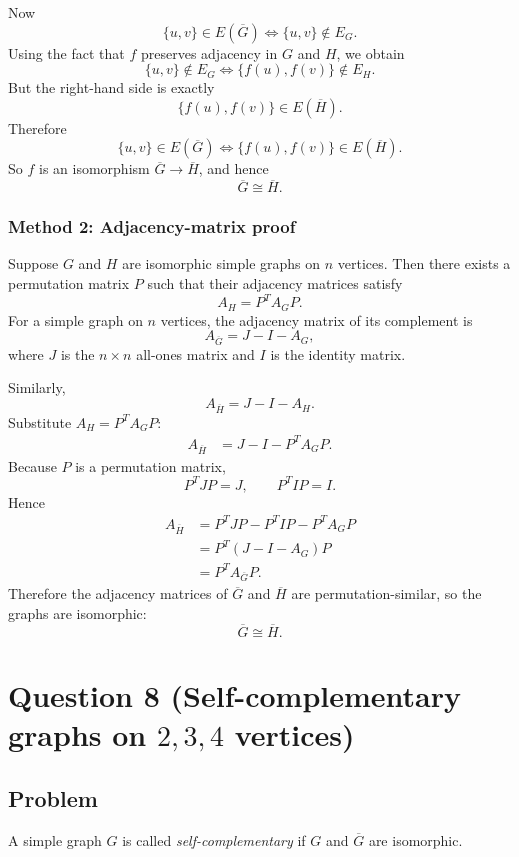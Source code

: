 \documentclass[12pt]{article}
\newcommand{\comp}[1]{\overline{#1}}
\begin{document}
Now
\[
\{u,v\}\in E(\comp{G})
\iff
\{u,v\}\notin E_G.
\]
Using the fact that \(f\) preserves adjacency in \(G\) and \(H\), we obtain
\[
\{u,v\}\notin E_G
\iff
\{f(u),f(v)\}\notin E_H.
\]
But the right-hand side is exactly
\[
\{f(u),f(v)\}\in E(\comp{H}).
\]
Therefore
\[
\{u,v\}\in E(\comp{G})
\iff
\{f(u),f(v)\}\in E(\comp{H}).
\]
So \(f\) is an isomorphism \(\comp{G}\to \comp{H}\), and hence
\[
\boxed{\comp{G}\cong \comp{H}.}
\]

\subsubsection{Method 2: Adjacency-matrix proof}
Suppose \(G\) and \(H\) are isomorphic simple graphs on \(n\) vertices. Then there exists a permutation matrix \(P\) such that their adjacency matrices satisfy
\[
A_H=P^{T}A_G P.
\]
For a simple graph on \(n\) vertices, the adjacency matrix of its complement is
\[
A_{\comp{G}}=J-I-A_G,
\]
where \(J\) is the \(n\times n\) all-ones matrix and \(I\) is the identity matrix.

Similarly,
\[
A_{\comp{H}}=J-I-A_H.
\]
Substitute \(A_H=P^{T}A_G P\):
\begin{align*}
A_{\comp{H}}
&=J-I-P^{T}A_G P.
\end{align*}
Because \(P\) is a permutation matrix,
\[
P^{T}JP=J,\qquad P^{T}IP=I.
\]
Hence
\begin{align*}
A_{\comp{H}}
&=P^{T}JP-P^{T}IP-P^{T}A_G P\\
&=P^{T}(J-I-A_G)P\\
&=P^{T}A_{\comp{G}}P.
\end{align*}
Therefore the adjacency matrices of \(\comp{G}\) and \(\comp{H}\) are permutation-similar, so the graphs are isomorphic:
\[
\boxed{\comp{G}\cong \comp{H}.}
\]

\newpage

\section{Question 8 (Self-complementary graphs on \(2,3,4\) vertices)}

\subsection{Problem}
A simple graph \(G\) is called \emph{self-complementary} if \(G\) and \(\comp{G}\) are isomorphic.
\end{document}
